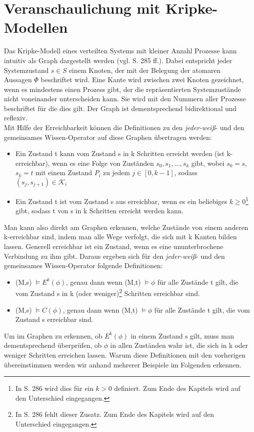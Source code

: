\section{Veranschaulichung mit Kripke-Modellen}
\label{Kripke-Modelle}
Das Kripke-Modell eines verteilten Systems mit kleiner Anzahl Prozesse kann intuitiv als Graph dargestellt werden (vgl. \cite{kshemkalyani2011distributed} S. 285 ff.). Dabei entspricht jeder Systemzustand $s\in S$ einem Knoten, der mit der Belegung der atomaren Aussagen $\Phi$ beschriftet wird. Eine Kante wird zwischen zwei Knoten gezeichnet, wenn es mindestens einen Prozess gibt, der die repräsentierten Systemzustände nicht voneinander unterscheiden kann. Sie wird mit den Nummern aller Prozesse beschriftet für die dies gilt.
Der Graph ist dementsprechend bidirektional und reflexiv.\\
Mit Hilfe der Erreichbarkeit können die Definitionen zu den \textit{jeder-weiß}- und den gemeinsames Wissen-Operator auf diese Graphen übertragen werden:
\begin{itemize}
	\item Ein Zustand t kann vom Zustand s in k Schritten erreicht werden (ist k-erreichbar), wenn es eine Folge von Zuständen $s_0,s_1,...,s_k$ gibt, wobei $s_0 = s$, $s_k = t$ mit einem Zustand $P_i$ zu jedem $j\in [ 0,k-1 ]$, sodass $(s_j,s_{j+1})\in \mathcal{K}_i$
	\item Ein Zustand t ist vom Zustand s aus erreichbar, wenn es ein beliebiges $k \ge 0$\footnote{\label{note1}In \cite{kshemkalyani2011distributed} S. 286 wird dies für ein $k > 0$ definiert. Zum Ende des Kapitels wird auf den Unterschied eingegangen.} gibt, sodass t von s in k Schritten erreicht werden kann.
\end{itemize}
Man kann also direkt am Graphen erkennen, welche Zustände von einem anderen k-erreichbar sind, indem man alle Wege verfolgt, die sich mit k Kanten bilden lassen.
Generell erreichbar ist ein Zustand, wenn es eine ununterbrochene Verbindung zu ihm gibt.
Daraus ergeben sich für den \textit{jeder-weiß}- und den gemeinsames Wissen-Operator folgende Definitionen:
\begin{itemize}
	\item (M,s) $\vDash E^{k}(\phi)$, genau dann wenn (M,t) $\vDash \phi$ für alle Zustände t gilt, die vom Zustand s in k (oder weniger)\footnote{\label{note2}In \cite{kshemkalyani2011distributed} S. 286 fehlt dieser Zusatz. Zum Ende des Kapitels wird auf den Unterschied eingegangen.} Schritten erreichbar sind.
	\item (M,s) $\vDash C(\phi)$, genau dann wenn (M,t) $\vDash \phi$ für alle Zustände t gilt, die vom Zustand s erreichbar sind.
\end{itemize}
Um im Graphen zu erkennen, ob $E^{k}(\phi)$ in einem Zustand s gilt, muss man dementsprechend überprüfen, ob $\phi$ in allen Zuständen wahr ist, die sich in k oder weniger Schritten erreichen lassen. 
Warum diese Definitionen mit den vorherigen übereinstimmen werden wir anhand mehrerer Beispiele im Folgenden erkennen.

